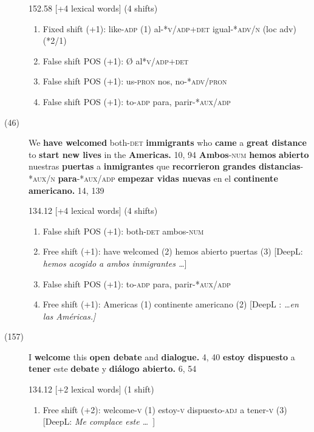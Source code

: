 \documentclass[output=paper]{langsci/langscibook}
\begin{document}
\begin{description}
    152.58 [+4 lexical words] (4 shifts)

    \begin{enumerate}
      \item Fixed shift (+1): like-\textsc{adp} (1) \rightarrow al-*\textsc{v/adp+det} igual-*\textsc{adv/n} (loc adv) (*2/1)
      \item False shift POS (+1): Ø \rightarrow al*\textsc{v/adp+det}
      \item False shift POS (+1): us-\textsc{pron} \rightarrow nos, no\textsc{-*adv/pron}
      \item False shift POS (+1): to\textsc{-adp} \rightarrow para, parir-*\textsc{aux/adp}
    \end{enumerate}

  \item[(46)] We \textbf{have welcomed} both\textsc{-det} \textbf{immigrants} who \textbf{came} a \textbf{great distance} to \textbf{start new lives} in the \textbf{Americas.} 10, 94 \rightarrow \textbf{Ambos}\textsc{-num} \textbf{hemos} \textbf{abierto} nuestras \textbf{puertas} a \textbf{inmigrantes} que \textbf{recorrieron grandes} \textbf{distancias}\textsc{-*aux/n}\textbf{ para}\textsc{-*aux/adp}\textbf{ empezar vidas nuevas} en el \textbf{continente americano.} 14, 139

    134.12 [+4 lexical words] (4 shifts)

    \begin{enumerate}
      \item False shift POS (+1): both-\textsc{det} \rightarrow ambos\textsc{-num}
      \item Free shift (+1): have welcomed (2) \rightarrow hemos abierto puertas (3) [DeepL: \textit{hemos acogido a ambos inmigrantes \dots}]
      \item False shift POS (+1): to-\textsc{adp} \rightarrow para, parir-*\textsc{aux/adp}
      \item Free shift (+1): Americas (1) \rightarrow continente americano (2) [DeepL : \textit{\dots en las Américas.]}
    \end{enumerate}

  \item[(157)] I \textbf{welcome} this \textbf{open debate} and \textbf{dialogue.} 4, 40 \rightarrow \textbf{estoy dispuesto} a \textbf{tener} este \textbf{debate} y \textbf{diálogo abierto.} 6, 54

    134.12 [+2 lexical words] (1 shift)

    \begin{enumerate}
      \item Free shift (+2): welcome-\textsc{v} (1) \rightarrow estoy-\textsc{v} dispuesto-\textsc{adj} a tener-\textsc{v} (3) [DeepL: \textit{Me complace este \dots\ }]
    \end{enumerate}


\end{description}
\end{document}
